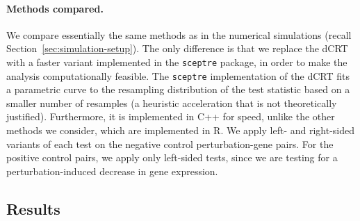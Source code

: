 \documentclass[12pt]{article}
\theoremstyle{definition}
\begin{document}
\paragraph{Methods compared.} We compare essentially the same methods as in the numerical simulations (recall Section~\ref{sec:simulation-setup}). The only difference is that we replace the dCRT with a faster variant implemented in the \verb|sceptre| package, in order to make the analysis computationally feasible. The \verb|sceptre| implementation of the dCRT fits a parametric curve to the resampling distribution of the test statistic based on a smaller number of resamples (a heuristic acceleration that is not theoretically justified). Furthermore, it is implemented in C++ for speed, unlike the other methods we consider, which are implemented in R. We apply left- and right-sided variants of each test on the negative control perturbation-gene pairs. For the positive control pairs, we apply only left-sided tests, since we are testing for a perturbation-induced decrease in gene expression.

\subsection{Results}
\end{document}
